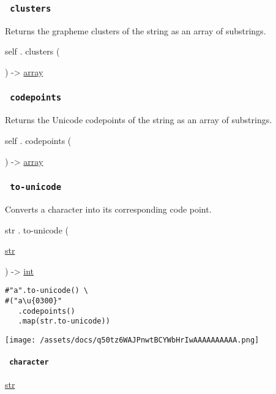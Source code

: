 \subsubsection{\texorpdfstring{\texttt{\ clusters\ }}{ clusters }}\label{definitions-clusters}

Returns the grapheme clusters of the string as an array of substrings.

self { . } { clusters } (

) -\textgreater{} \href{/docs/reference/foundations/array/}{array}

\subsubsection{\texorpdfstring{\texttt{\ codepoints\ }}{ codepoints }}\label{definitions-codepoints}

Returns the Unicode codepoints of the string as an array of substrings.

self { . } { codepoints } (

) -\textgreater{} \href{/docs/reference/foundations/array/}{array}

\subsubsection{\texorpdfstring{\texttt{\ to-unicode\ }}{ to-unicode }}\label{definitions-to-unicode}

Converts a character into its corresponding code point.

str { . } { to-unicode } (

{ \href{/docs/reference/foundations/str/}{str} }

) -\textgreater{} \href{/docs/reference/foundations/int/}{int}

\begin{verbatim}
#"a".to-unicode() \
#("a\u{0300}"
   .codepoints()
   .map(str.to-unicode))
\end{verbatim}

\texttt{[image: /assets/docs/q50tz6WAJPnwtBCYWbHrIwAAAAAAAAAA.png]}

\paragraph{\texorpdfstring{\texttt{\ character\ }}{ character }}\label{definitions-to-unicode-character}

\href{/docs/reference/foundations/str/}{str}

